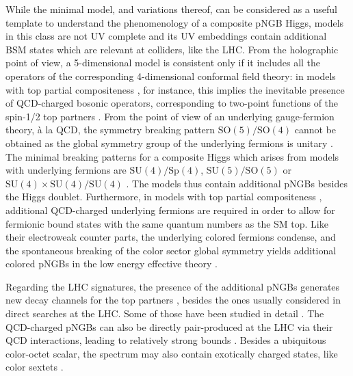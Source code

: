 \documentclass[preprintnumbers,nofootinbib,showpacs,eqsecnum,pre,12pt]{revtex4-1}
\newcommand{\SO}{\text{SO}}
\newcommand{\SU}{\text{SU}}
\newcommand{\Sp}{\text{Sp}}
\begin{document}
While the minimal model, and variations thereof, can be considered as a useful template to understand the phenomenology of a composite pNGB Higgs, models in this class  are not UV complete and its UV embeddings contain additional BSM states which are relevant at colliders, like the LHC. From the holographic point of view, a 5-dimensional model is consistent only if it includes all the operators of the corresponding 4-dimensional conformal field theory: in models with top partial compositeness \cite{Kaplan:1991dc}, for instance, this implies the inevitable presence of QCD-charged bosonic operators, corresponding to two-point functions of the spin-1/2 top partners \cite{Cacciapaglia:2020kgq}.
From the point of view of an underlying gauge-fermion theory, \`a la QCD, the symmetry breaking pattern $\SO(5)/\SO(4)$ cannot be obtained as the global symmetry group of the underlying fermions is unitary \cite{Cacciapaglia:2014uja,Cacciapaglia:2020kgq}. The minimal breaking patterns for a composite Higgs which arises from models with underlying fermions are $\SU(4)/\Sp(4)$, $\SU(5)/\SO(5)$ or $\SU(4)\times \SU(4) / \SU(4)$ \cite{Dugan:1984hq,Galloway:2010bp,Cacciapaglia:2014uja,Ma:2015gra}. The models thus contain additional pNGBs besides the Higgs doublet. Furthermore, in models with top partial compositeness \cite{Barnard:2013zea,Ferretti:2013kya,Vecchi:2015fma}, additional QCD-charged underlying fermions are required in order to allow for fermionic bound states with the same quantum numbers as the SM top. Like their electroweak counter parts, the underlying colored fermions condense, and the spontaneous breaking of the color sector global symmetry yields additional colored pNGBs in the low energy effective theory \cite{Ferretti:2016upr}. 

Regarding the LHC signatures, the presence of the additional pNGBs generates new decay channels for the top partners \cite{Bizot:2018tds}, besides the ones usually considered in direct searches at the LHC. Some of those have been studied in detail \cite{Chala:2017xgc,Aguilar-Saavedra:2017giu,Han:2018hcu,Kim:2018mks,Alhazmi:2018whk,Xie:2019gya,Cacciapaglia:2019zmj,Benbrik:2019zdp,Aguilar-Saavedra:2019ghg,Wang:2020ips,Corcella:2021mdl}. The QCD-charged pNGBs can also be directly pair-produced at the LHC via their QCD interactions, leading to relatively strong bounds \cite{Cacciapaglia:2015eqa,Belyaev:2016ftv,Cacciapaglia:2019bqz,Cacciapaglia:2020vyf}. Besides a ubiquitous color-octet scalar, the spectrum may also contain exotically charged states, like color sextets \cite{Cacciapaglia:2015eqa}.
\end{document}
